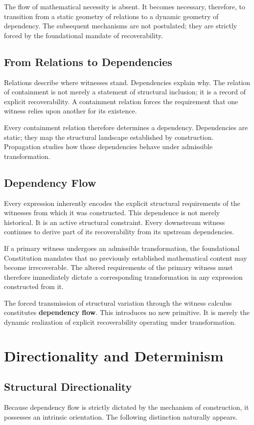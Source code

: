 \documentclass[12pt,anyside]{book}
\begin{document}
The flow of mathematical necessity is absent. It becomes necessary, therefore, to transition from a static geometry of relations to a dynamic geometry of dependency. The subsequent mechanisms are not postulated; they are strictly forced by the foundational mandate of recoverability.

\subsection{From Relations to Dependencies}
Relations describe where witnesses stand. Dependencies explain why. The relation of containment is not merely a statement of structural inclusion; it is a record of explicit recoverability. A containment relation forces the requirement that one witness relies upon another for its existence. 

Every containment relation therefore determines a dependency. Dependencies are static; they map the structural landscape established by construction. Propagation studies how those dependencies behave under admissible transformation. 

\subsection{Dependency Flow}
Every expression inherently encodes the explicit structural requirements of the witnesses from which it was constructed. This dependence is not merely historical. It is an active structural constraint. Every downstream witness continues to derive part of its recoverability from its upstream dependencies. 

If a primary witness undergoes an admissible transformation, the foundational Constitution mandates that no previously established mathematical content may become irrecoverable. The altered requirements of the primary witness must therefore immediately dictate a corresponding transformation in any expression constructed from it. 

The forced transmission of structural variation through the witness calculus constitutes \textbf{dependency flow}. This introduces no new primitive. It is merely the dynamic realization of explicit recoverability operating under transformation.

\section{Directionality and Determinism}

\subsection{Structural Directionality}
Because dependency flow is strictly dictated by the mechanism of construction, it possesses an intrinsic orientation. The following distinction naturally appears.
\end{document}
